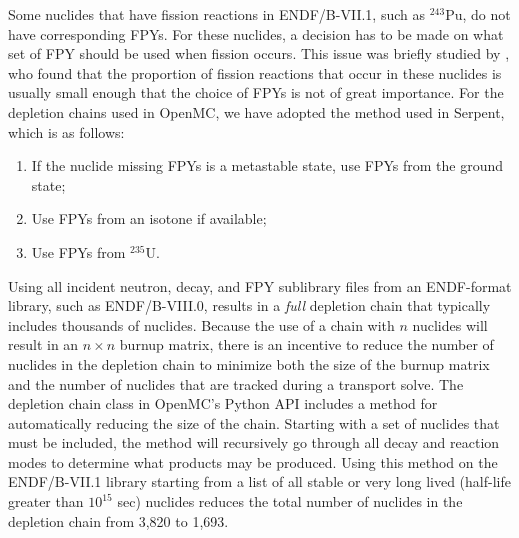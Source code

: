 \documentclass[3p,authoryear]{elsarticle}
\begin{document}
Some nuclides that have fission reactions in ENDF/B-VII.1, such as $^{243}$Pu,
do not have corresponding FPYs. For these nuclides, a decision has to be made on
what set of FPY should be used when fission occurs. This issue was briefly
studied by \citet{fensin2015pne}, who found that the proportion of fission
reactions that occur in these nuclides is usually small enough that the choice
of FPYs is not of great importance. For the depletion chains used in OpenMC, we
have adopted the method used in Serpent, which is as follows:
\begin{enumerate}
  \item If the nuclide missing FPYs is a metastable state, use FPYs from the
  ground state;
  \item Use FPYs from an isotone if available;
  \item Use FPYs from $^{235}$U.
\end{enumerate}

Using all incident neutron, decay, and FPY sublibrary files from an ENDF-format
library, such as ENDF/B-VIII.0, results in a \emph{full} depletion chain that
typically includes thousands of nuclides. Because the use of a chain with $n$
nuclides will result in an $n\times n$ burnup matrix, there is an incentive to
reduce the number of nuclides in the depletion chain to minimize both the size
of the burnup matrix and the number of nuclides that are tracked during a
transport solve. The depletion chain class in OpenMC's Python API includes a
method for automatically reducing the size of the chain. Starting with a set of
nuclides that must be included, the method will recursively go through all decay
and reaction modes to determine what products may be produced. Using this method
on the ENDF/B-VII.1 library starting from a list of all stable or very long
lived (half-life greater than $10^{15}$ sec) nuclides reduces the total number
of nuclides in the depletion chain from 3,820 to 1,693.
\end{document}
